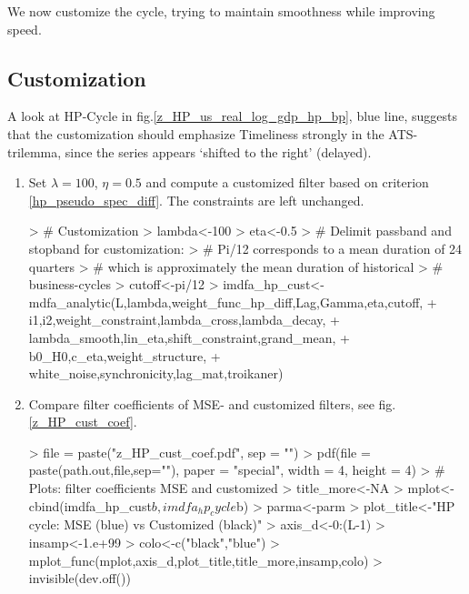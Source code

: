 \documentclass[a4paper]{book}
\begin{document}
We now customize the cycle, trying to maintain smoothness while improving speed.



\subsection{Customization}


A look at HP-Cycle in fig.\ref{z_HP_us_real_log_gdp_hp_bp}, blue line, suggests that the customization should emphasize Timeliness strongly in the ATS-trilemma, since the series appears `shifted to the right' (delayed).

\begin{enumerate}
\item Set $\lambda=100$, $\eta=0.5$ and compute a customized filter based on criterion \ref{hp_pseudo_spec_diff}. The constraints are left unchanged. 
\begin{Schunk}
\begin{Sinput}
> # Customization
> lambda<-100
> eta<-0.5
> # Delimit passband and stopband for customization:
> #   Pi/12 corresponds to a mean duration of 24 quarters
> #   which is approximately the mean duration of historical 
> #   business-cycles
> cutoff<-pi/12
> imdfa_hp_cust<-mdfa_analytic(L,lambda,weight_func_hp_diff,Lag,Gamma,eta,cutoff,
+                         i1,i2,weight_constraint,lambda_cross,lambda_decay,
+                         lambda_smooth,lin_eta,shift_constraint,grand_mean,
+                         b0_H0,c_eta,weight_structure,
+                         white_noise,synchronicity,lag_mat,troikaner)
\end{Sinput}
\end{Schunk}
\item Compare filter coefficients of MSE- and customized filters, see fig.\ref{z_HP_cust_coef}.
\begin{Schunk}
\begin{Sinput}
> file = paste("z_HP_cust_coef.pdf", sep = "")
> pdf(file = paste(path.out,file,sep=""), paper = "special", width = 4, height = 4)
> # Plots: filter coefficients MSE and customized
> title_more<-NA
> mplot<-cbind(imdfa_hp_cust$b,imdfa_hp_cycle$b)
> parma<-parm
> plot_title<-"HP cycle: MSE (blue) vs Customized (black)"
> axis_d<-0:(L-1)
> insamp<-1.e+99
> colo<-c("black","blue")
> mplot_func(mplot,axis_d,plot_title,title_more,insamp,colo)
> invisible(dev.off())
\end{Sinput}
\end{Schunk}

\end{enumerate}
\end{document}
